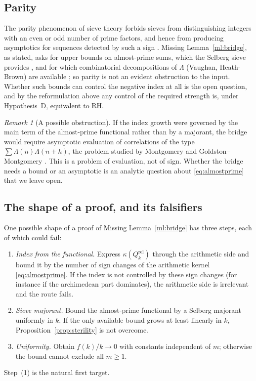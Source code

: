 \documentclass[11pt]{amsart}
\theoremstyle{definition}
\theoremstyle{remark}
\newtheorem{remark}[theorem]{Remark}
\newcommand{\La}{\Lambda}
\begin{document}
\subsection{Parity}
The parity phenomenon of sieve theory forbids sieves from distinguishing integers with an even
or odd number of prime factors, and hence from producing asymptotics for sequences detected by
such a sign \cite{bgFI}. Missing Lemma~\ref{ml:bridge}, as stated, asks for upper bounds on
almost-prime sums, which the Selberg sieve provides \cite{bgFI}, and for which combinatorial
decompositions of $\La$ (Vaughan, Heath-Brown) are available \cite{bgIK}; so parity is not an evident obstruction to the input. Whether such
bounds can control the negative index at all is the open question, and by the reformulation
above any control of the required strength is, under Hypothesis~D, equivalent to RH.

\begin{remark}[A possible obstruction]
If the index growth were governed by the main term of the almost-prime functional rather than
by a majorant, the bridge would require asymptotic evaluation of correlations of the type
$\sum\La(n)\La(n+h)$, the problem studied by Montgomery \cite{Mont73} and Goldston--Montgomery
\cite{GM87}. This is a problem of evaluation, not of sign. Whether the bridge needs a bound or
an asymptotic is an analytic question about \eqref{eq:almostprime} that we leave open.
\end{remark}

\subsection{The shape of a proof, and its falsifiers}
One possible shape of a proof of Missing Lemma~\ref{ml:bridge} has three steps, each of which
could fail:
\begin{enumerate}[\rm(1)]
\item \emph{Index from the functional.} Express $\kappa(Q_k^{\mathrm{rel}})$ through the
arithmetic side and bound it by the number of sign changes of the arithmetic kernel
\eqref{eq:almostprime}. If the index is not controlled by these sign changes (for instance if the
archimedean part dominates), the arithmetic side is irrelevant and the route fails.
\item \emph{Sieve majorant.} Bound the almost-prime functional by a Selberg majorant uniformly
in $k$. If the only available bound grows at least linearly in $k$,
Proposition~\ref{prop:sterility} is not overcome.
\item \emph{Uniformity.} Obtain $f(k)/k\to0$ with constants independent of $m$; otherwise the
bound cannot exclude all $m\ge1$.
\end{enumerate}
Step~(1) is the natural first target.
\end{document}
